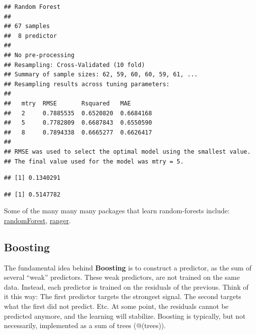 \documentclass[]{book}
\newenvironment{Shaded}{\begin{snugshade}}{\end{snugshade}}
\newcommand{\KeywordTok}[1]{\textcolor[rgb]{0.13,0.29,0.53}{\textbf{#1}}}
\newcommand{\DataTypeTok}[1]{\textcolor[rgb]{0.13,0.29,0.53}{#1}}
\newcommand{\DecValTok}[1]{\textcolor[rgb]{0.00,0.00,0.81}{#1}}
\newcommand{\StringTok}[1]{\textcolor[rgb]{0.31,0.60,0.02}{#1}}
\newcommand{\CommentTok}[1]{\textcolor[rgb]{0.56,0.35,0.01}{\textit{#1}}}
\newcommand{\OperatorTok}[1]{\textcolor[rgb]{0.81,0.36,0.00}{\textbf{#1}}}
\newcommand{\NormalTok}[1]{#1}
\theoremstyle{definition}
\theoremstyle{definition}
\theoremstyle{definition}
\theoremstyle{remark}
\begin{document}
\begin{verbatim}
## Random Forest 
## 
## 67 samples
##  8 predictor
## 
## No pre-processing
## Resampling: Cross-Validated (10 fold) 
## Summary of sample sizes: 62, 59, 60, 60, 59, 61, ... 
## Resampling results across tuning parameters:
## 
##   mtry  RMSE       Rsquared   MAE      
##   2     0.7885535  0.6520820  0.6684168
##   5     0.7782809  0.6687843  0.6550590
##   8     0.7894338  0.6665277  0.6626417
## 
## RMSE was used to select the optimal model using the smallest value.
## The final value used for the model was mtry = 5.
\end{verbatim}

\begin{Shaded}
\end{Shaded}

\begin{verbatim}
## [1] 0.1340291
\end{verbatim}

\begin{Shaded}
\end{Shaded}

\begin{verbatim}
## [1] 0.5147782
\end{verbatim}

Some of the many many many packages that learn random-forests include:
\href{https://cran.r-project.org/package=randomForest}{randomForest},
\href{https://cran.r-project.org/package=ranger}{ranger}.

\subsection{Boosting}\label{boosting}

The fundamental idea behind \textbf{Boosting} is to construct a
predictor, as the sum of several ``weak'' predictors. These weak
predictors, are not trained on the same data. Instead, each predictor is
trained on the residuals of the previous. Think of it this way: The
first predictor targets the strongest signal. The second targets what
the first did not predict. Etc. At some point, the residuals cannot be
predicted anymore, and the learning will stabilize. Boosting is
typically, but not necessarily, implemented as a sum of trees
(@(trees)).
\end{document}
